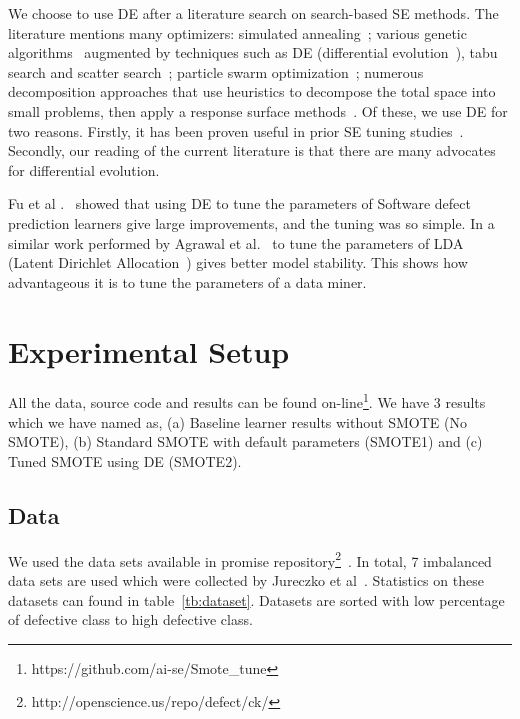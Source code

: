 \documentclass[sigconf]{acmart}
\theoremstyle{break}
\begin{document}
We choose to use DE after a literature search on search-based SE methods.
The literature mentions many optimizers: simulated
annealing~\cite{feather2002converging, menzies2007business}; various genetic
algorithms~\cite{goldberg1979complexity} augmented by techniques such as
DE (differential evolution~\cite{storn1997differential}), tabu search and scatter
search~\cite{glover1986general, beausoleil2006moss, molina2007sspmo,nebro2008abyss}; particle swarm optimization~\cite{pan2008particle}; numerous
decomposition approaches that use heuristics to decompose the total space into
small problems, then apply a response surface methods~\cite{krall2015gale, zuluaga2013active}.
Of these, we use DE for two reasons. Firstly, it has been proven useful in prior SE tuning
studies~\cite{fu2016tuning, agrawal2016wrong}. Secondly, our reading of the current literature is
that there are many advocates for differential evolution.

Fu et al .~\cite{fu2016tuning} showed that using DE to tune the parameters of Software defect prediction learners give large improvements, and the tuning was so simple. In a similar work performed by Agrawal et al.~\cite{agrawal2016wrong} to tune the parameters of LDA (Latent Dirichlet Allocation~\cite{blei2003latent}) gives better model stability. This shows how advantageous it is to tune the parameters of a data miner.

\section{Experimental Setup}
\label{sect:experiment}

All the data, source code and results can be found on-line\footnote{https://github.com/ai-se/Smote\_tune}. We have 3 results which we have named as, (a) Baseline learner results without SMOTE (No SMOTE), (b) Standard SMOTE with default parameters (SMOTE1) and (c) Tuned SMOTE using DE (SMOTE2).

\subsection{\textbf{Data}}
 We used the data sets available in promise repository\footnote{http://openscience.us/repo/defect/ck/}~\cite{promiserepo}. In total, 7 imbalanced data sets are used which were collected by Jureczko et al~\cite{jureczko2010towards}. Statistics on these datasets can found in table~\ref{tb:dataset}. Datasets are sorted with low percentage of defective class to high defective class.
 
\end{document}

